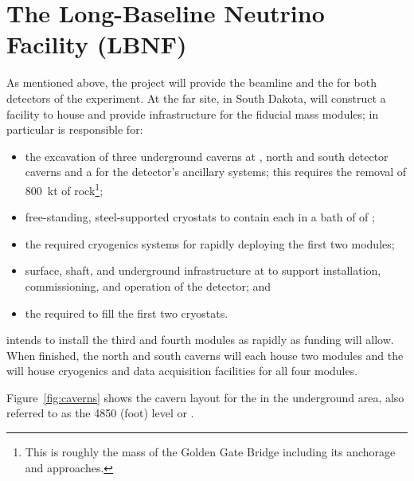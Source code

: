 \section{The Long-Baseline Neutrino Facility (LBNF)} 
\label{sec:exec:lbnf}

As mentioned above, the  project will provide the beamline and the  for both detectors of the  experiment. At the far site,  in South Dakota,  will construct a facility to house and provide infrastructure for the   \nominalmodsize fiducial mass  modules; in particular  is responsible for:

\begin{itemize}

\item the excavation of three underground caverns at , north and south detector caverns and a  for the detector's ancillary systems; this requires the removal of \SI{800}{kt} of rock\footnote{This is roughly the mass of the Golden Gate Bridge including its anchorage and approaches.};

 \item free-standing, steel-supported cryostats to contain each  in a bath of \larmass of ;   
 \item the required cryogenics systems for rapidly deploying the first two modules;

\item surface, shaft, and underground infrastructure at   to support installation, commissioning, and operation of the detector; and

\item the  required to fill the first two cryostats.
\end{itemize}

 intends to install the third and fourth  modules as rapidly as funding will 
allow. When finished, the north and south caverns will each house two modules and the  will house cryogenics and data acquisition facilities for all four modules.

Figure~\ref{fig:caverns} shows the cavern layout for the  in the  underground area, also referred to as the 4850 (foot) level or .  


